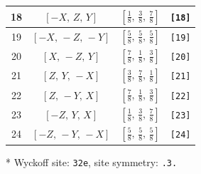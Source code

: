 \documentclass[fleqn,8pt]{jsarticle}
\begin{document}
\begin{longtable}{cccc}
18 & $\left[ - X,\, Z,\, Y \right]$ & $\left[ \frac{1}{8},\, \frac{3}{8},\, \frac{7}{8} \right]$ & {\tt [18]} \\ \hline
19 & $\left[ - X,\, - Z,\, - Y \right]$ & $\left[ \frac{5}{8},\, \frac{5}{8},\, \frac{5}{8} \right]$ & {\tt [19]} \\ \hline
20 & $\left[ X,\, - Z,\, Y \right]$ & $\left[ \frac{7}{8},\, \frac{1}{8},\, \frac{3}{8} \right]$ & {\tt [20]} \\ \hline
21 & $\left[ Z,\, Y,\, - X \right]$ & $\left[ \frac{3}{8},\, \frac{7}{8},\, \frac{1}{8} \right]$ & {\tt [21]} \\ \hline
22 & $\left[ Z,\, - Y,\, X \right]$ & $\left[ \frac{7}{8},\, \frac{1}{8},\, \frac{3}{8} \right]$ & {\tt [22]} \\ \hline
23 & $\left[ - Z,\, Y,\, X \right]$ & $\left[ \frac{1}{8},\, \frac{3}{8},\, \frac{7}{8} \right]$ & {\tt [23]} \\ \hline
24 & $\left[ - Z,\, - Y,\, - X \right]$ & $\left[ \frac{5}{8},\, \frac{5}{8},\, \frac{5}{8} \right]$ & {\tt [24]} \\
\end{longtable}
* Wyckoff site: {\tt 32e}, site symmetry: {\tt .3.}
\renewcommand{\arraystretch}{1.2}
\end{document}
